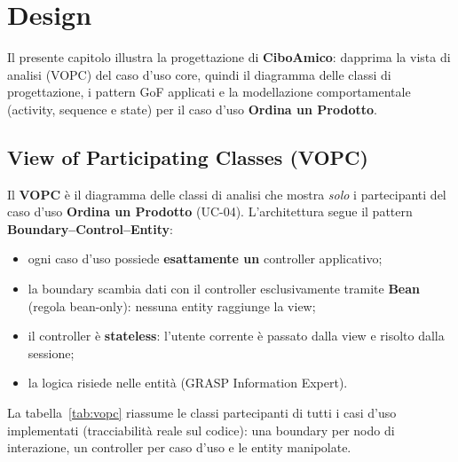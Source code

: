 \chapter{Design}
\label{cap:design}

Il presente capitolo illustra la progettazione di \textbf{CiboAmico}: dapprima la vista di analisi (VOPC) del caso d'uso core, quindi il diagramma delle classi di progettazione, i pattern GoF applicati e la modellazione comportamentale (activity, sequence e state) per il caso d'uso \textbf{Ordina un Prodotto}.

\section{View of Participating Classes (VOPC)}
\label{sec:vopc}

Il \textbf{VOPC} è il diagramma delle classi di analisi che mostra \emph{solo} i partecipanti del caso d'uso \textbf{Ordina un Prodotto} (UC-04). L'architettura segue il pattern \textbf{Boundary--Control--Entity}:
\begin{itemize}
    \item ogni caso d'uso possiede \textbf{esattamente un} controller applicativo;
    \item la boundary scambia dati con il controller esclusivamente tramite \textbf{Bean} (regola bean-only): nessuna entity raggiunge la view;
    \item il controller è \textbf{stateless}: l'utente corrente è passato dalla view e risolto dalla sessione;
    \item la logica risiede nelle entità (GRASP Information Expert).
\end{itemize}

La tabella~\ref{tab:vopc} riassume le classi partecipanti di tutti i casi d'uso implementati (tracciabilità reale sul codice): una boundary per nodo di interazione, un controller per caso d'uso e le entity manipolate.

